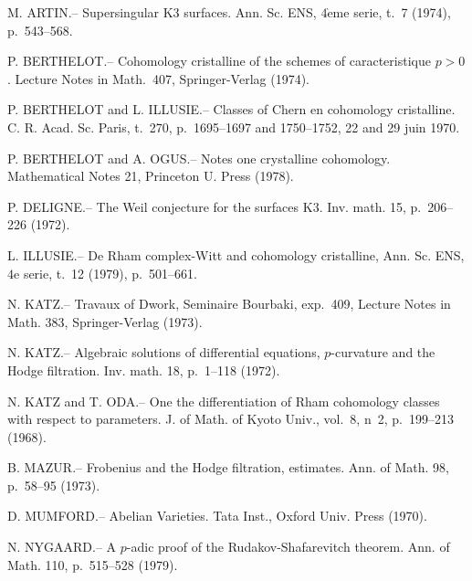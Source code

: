 \documentclass[12pt,a4paper]{article}
\theoremstyle{plain}
\theoremstyle{definition}
\theoremstyle{remark}
\begin{document}
\begin{enumerate}[label={[\arabic*]}, leftmargin=2em, itemsep=0.3em]
\item M. ARTIN.-- Supersingular K3 surfaces. Ann. Sc. ENS, $4\mathrm{\grave{e}me}$ serie, t.~7 (1974), p.~543--568.

\item P. BERTHELOT.-- Cohomology cristalline of the schemes of caracteristique $p > 0$. Lecture Notes in Math.~407, Springer-Verlag (1974).

\item P. BERTHELOT and L. ILLUSIE.-- Classes of Chern en cohomology cristalline. C. R. Acad. Sc. Paris, t.~270, p.~1695--1697 and 1750--1752, 22 and 29 juin 1970.

\item P. BERTHELOT and A. OGUS.-- Notes one crystalline cohomology. Mathematical Notes 21, Princeton U. Press (1978).

\item P. DELIGNE.-- The Weil conjecture for the surfaces K3. Inv. math. 15, p.~206--226 (1972).

\item L. ILLUSIE.-- De Rham complex-Witt and cohomology cristalline, Ann. Sc. ENS, $4\mathrm{e}$ serie, t.~12 (1979), p.~501--661.

\item N. KATZ.-- Travaux of Dwork, Seminaire Bourbaki, exp.~409, Lecture Notes in Math. 383, Springer-Verlag (1973).

\item N. KATZ.-- Algebraic solutions of differential equations, $p$-curvature and the Hodge filtration. Inv. math. 18, p.~1--118 (1972).

\item N. KATZ and T. ODA.-- One the differentiation of Rham cohomology classes with respect to parameters. J. of Math. of Kyoto Univ., vol.~8, n~2, p.~199--213 (1968).

\item[$\text{[10]}$] B. MAZUR.-- Frobenius and the Hodge filtration, estimates. Ann. of Math. 98, p.~58--95 (1973).

\item[$\text{[11]}$] D. MUMFORD.-- Abelian Varieties. Tata Inst., Oxford Univ. Press (1970).

\item[$\text{[12]}$] N. NYGAARD.-- A $p$-adic proof of the Rudakov-Shafarevitch theorem. Ann. of Math. 110, p.~515--528 (1979).


\end{enumerate}
\end{document}
